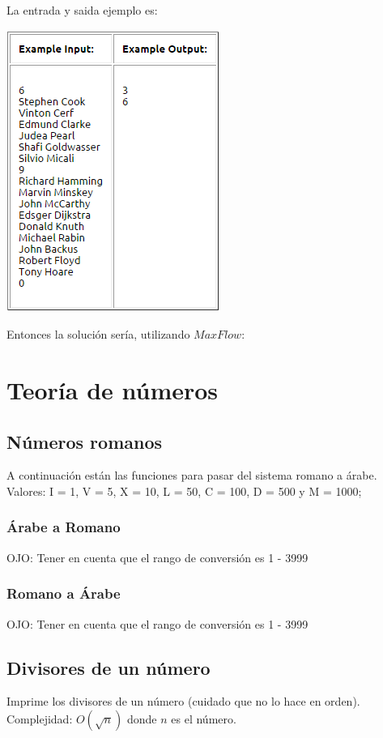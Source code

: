 \documentclass[10pt,letterpaper]{article}
\newcommand{\source}[1]{
  
  \dotfill
}
\begin{document}
\newline
La entrada y saida ejemplo es:\\
  \begin{center}
  \includegraphics{./src/konigSample.png}
  \end{center}
Entonces la solución sería, utilizando $MaxFlow$:\\
  \source{src/konigSampleCode.cpp}
\section{Teoría de números}
  \subsection{Números romanos}
    A continuación están las funciones para pasar del sistema romano a árabe.\\
    Valores: I = 1, V = 5, X = 10, L = 50, C = 100, D = 500 y M = 1000;
    \subsubsection{Árabe a Romano}
      OJO: Tener en cuenta que el rango de conversión es 1 - 3999
      \source{src/arabicToRoman.cpp}
    \subsubsection{Romano a Árabe}
      OJO: Tener en cuenta que el rango de conversión es 1 - 3999
      \source{src/romanToArabic.cpp}
    \subsection{Divisores de un número}
      Imprime los divisores de un número (cuidado que no lo hace en orden).\\
      Complejidad: $O(\sqrt{n})$ donde $n$ es el número.\\
      \source{./src/divisors.cpp}
\end{document}
